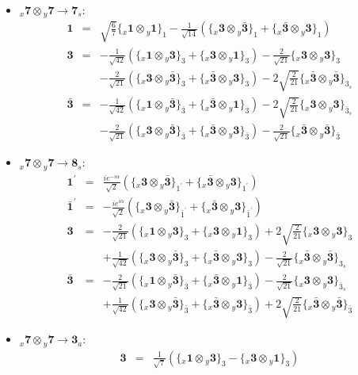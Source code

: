 \documentclass[english]{article}
\newcommand{\rep}[1]{\mathbf{#1}}
\newcommand{\repx}[2]{{}_{#2}\mathbf{#1}}
\newcommand{\subcg}[3]{\big\{ \repx{#1}{x}\otimes\repx{#2}{y}\big\}^{}_{#3}}
\begin{document}
\begin{itemize}
\begin{eqnarray*}
\end{eqnarray*}
\item $\repx{7}{x}\otimes\repx{7}{y}\to\rep{7}_{s}$:
\begin{eqnarray*}
\rep{1} &=& \sqrt{\frac{6}{7}}\subcg{1}{1}{1}-\frac{1}{\sqrt{14}}\left(\subcg{3}{\bar{3}}{1}+\subcg{\bar{3}}{3}{1}\right)
\\
\rep{3} &=& -\frac{1}{\sqrt{42}}\left(\subcg{1}{3}{3}+\subcg{3}{1}{3}\right)-\frac{2}{\sqrt{21}}\subcg{3}{3}{3} \\ 
 & & -\frac{2}{\sqrt{21}}\left(\subcg{3}{\bar{3}}{3}+\subcg{\bar{3}}{3}{3}\right)-2 \sqrt{\frac{2}{21}}\subcg{\bar{3}}{\bar{3}}{3_{s}}
\\
\rep{\bar{3}} &=& -\frac{1}{\sqrt{42}}\left(\subcg{1}{\bar{3}}{\bar{3}}+\subcg{\bar{3}}{1}{\bar{3}}\right)-2 \sqrt{\frac{2}{21}}\subcg{3}{3}{\bar{3}_{s}} \\ 
 & & -\frac{2}{\sqrt{21}}\left(\subcg{3}{\bar{3}}{\bar{3}}+\subcg{\bar{3}}{3}{\bar{3}}\right)-\frac{2}{\sqrt{21}}\subcg{\bar{3}}{\bar{3}}{\bar{3}}
\end{eqnarray*}
\item $\repx{7}{x}\otimes\repx{7}{y}\to\rep{8}_{s}$:
\begin{eqnarray*}
\rep{1^{\prime}} &=& \frac{i e^{-i \alpha }}{\sqrt{2}}\left(\subcg{3}{\bar{3}}{1^{\prime}}+\subcg{\bar{3}}{3}{1^{\prime}}\right)
\\
\rep{\bar{1}^{\prime}} &=& -\frac{i e^{i \alpha }}{\sqrt{2}}\left(\subcg{3}{\bar{3}}{\bar{1}^{\prime}}+\subcg{\bar{3}}{3}{\bar{1}^{\prime}}\right)
\\
\rep{3} &=& -\frac{2}{\sqrt{21}}\left(\subcg{1}{3}{3}+\subcg{3}{1}{3}\right)+2 \sqrt{\frac{2}{21}}\subcg{3}{3}{3} \\ 
 & & +\frac{1}{\sqrt{42}}\left(\subcg{3}{\bar{3}}{3}+\subcg{\bar{3}}{3}{3}\right)-\frac{2}{\sqrt{21}}\subcg{\bar{3}}{\bar{3}}{3_{s}}
\\
\rep{\bar{3}} &=& -\frac{2}{\sqrt{21}}\left(\subcg{1}{\bar{3}}{\bar{3}}+\subcg{\bar{3}}{1}{\bar{3}}\right)-\frac{2}{\sqrt{21}}\subcg{3}{3}{\bar{3}_{s}} \\ 
 & & +\frac{1}{\sqrt{42}}\left(\subcg{3}{\bar{3}}{\bar{3}}+\subcg{\bar{3}}{3}{\bar{3}}\right)+2 \sqrt{\frac{2}{21}}\subcg{\bar{3}}{\bar{3}}{\bar{3}}
\end{eqnarray*}
\item $\repx{7}{x}\otimes\repx{7}{y}\to\rep{3}_{a}$:
\begin{eqnarray*}
\rep{3} &=& \frac{1}{\sqrt{7}}\left(\subcg{1}{3}{3}-\subcg{3}{1}{3}\right) \\ 

\end{eqnarray*}
\end{itemize}
\end{document}
